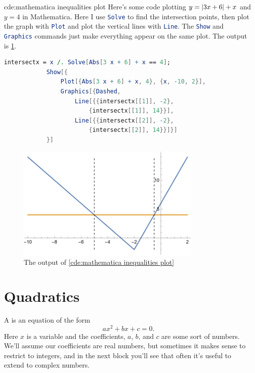 \documentclass[fleqn]{LectureClass/LectureClass}
\begin{document}
    \begin{cde}{}{cde:mathematica inequalities plot}
        Here's some code plotting \(y = \lvert3x + 6\rvert + x\) and \(y = 4\) in Mathematica.
        Here I use \lstinline[language=Mathematica]|Solve| to find the intersection points, then plot the graph with \lstinline[language=Mathematica]|Plot| and plot the vertical lines with \lstinline[language=Mathematica]|Line|.
        The \lstinline[language=Mathematica]|Show| and \lstinline[language=Mathematica]|Graphics| commands just make everything appear on the same plot.
        The output is \cref{fig:mathematica inequalities plot}.
        
        \begin{lstlisting}[gobble=12, language=Mathematica]
            intersectx = x /. Solve[Abs[3 x + 6] + x == 4];
            Show[{
                Plot[{Abs[3 x + 6] + x, 4}, {x, -10, 2}],
                Graphics[{Dashed, 
                    Line[{{intersectx[[1]], -2},
                        {intersectx[[1]], 14}}], 
                    Line[{{intersectx[[2]], -2},
                        {intersectx[[2]], 14}}]}]
            }]
        \end{lstlisting}
    \end{cde}
    
    \begin{figure}
        \centering
        \includegraphics[width=0.8\textwidth]{images/inequalities-plot-abs-value-mathematica-output}
        \caption{The output of \cref{cde:mathematica inequalities plot}}
        \label{fig:mathematica inequalities plot}
    \end{figure}
    
    \section{Quadratics}
    A  is an equation of the form
    \begin{equation}
        \label{eqn:quardatic}
        ax^2 + bx + c = 0.
    \end{equation}
    Here \(x\) is a variable and the coefficients, \(a\), \(b\), and \(c\) are some sort of numbers.
    We'll assume our coefficients are real numbers, but sometimes it makes sense to restrict to integers, and in the next block you'll see that often it's useful to extend to complex numbers.
    
\end{document}
